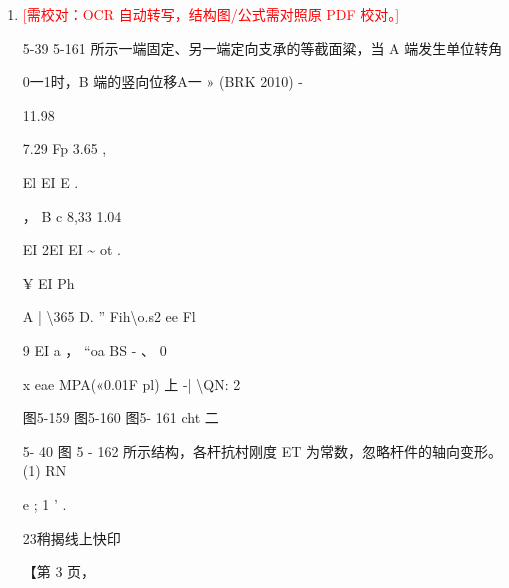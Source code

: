 \documentclass[UTF8,12pt,a4paper,openany]{ctexbook}
\newcommand{\TODO}[1]{\textcolor{red}{[需校对：#1]}}
\begin{document}
\begin{enumerate}[label=\textbf{\arabic*.},leftmargin=2em]
\item \TODO{OCR 自动转写，结构图/公式需对照原 PDF 校对。}\par 5-39 5-161 所示一端固定、另一端定向支承的等截面粱，当 A 端发生单位转角\par 0一1时，B 端的竖向位移A一           » (BRK 2010)     -\par 11.98\par 7.29      Fp    3.65                  ,\par El            EI  E          .\par ，                            B       c     8,33    1.04\par EI      2EI         EI    \textasciitilde{}     ot          .\par ¥     EI Ph\par A | \textbackslash{}365     D.  ” Fih\textbackslash{}o.s2      ee         Fl\par 9    EI            a     ，           “oa BS -  、 0\par x eae                             MPA(«0.01F pl)          上 -|            \textbackslash{}QN: 2\par 图5-159                 图5-160                       图5- 161        cht 二\par 5- 40 图 5 - 162 所示结构，各杆抗村刚度 ET 为常数，忽略杆件的轴向变形。(1) RN\par e  ; 1 ' .\par 23稍揭线上快印\par \par 【第 3 页，
\end{enumerate}
\end{document}
